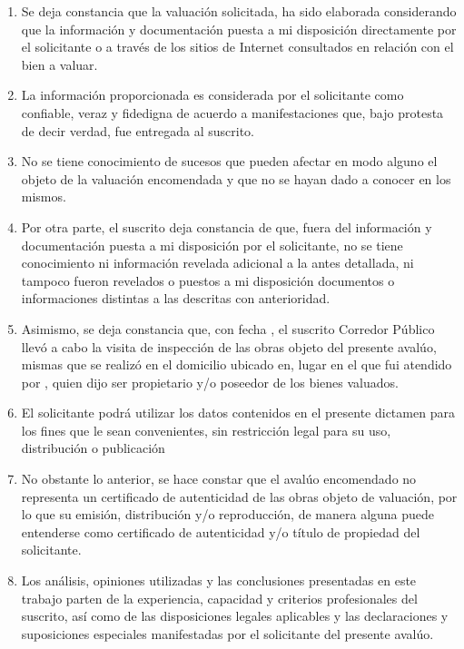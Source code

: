 \begin{enumerate}[\indent a)]

\item Se deja constancia que la valuaci\'on solicitada, ha sido elaborada considerando que la informaci\'on y documentaci\'on puesta a mi disposici\'on directamente por el solicitante o a trav\'es de los sitios de Internet consultados en relaci\'on con el bien a valuar.

\item La informaci\'on proporcionada es considerada por el solicitante como confiable, veraz y fidedigna de acuerdo a manifestaciones que, bajo protesta de decir verdad, fue entregada al suscrito.

\item No se tiene conocimiento de sucesos que pueden afectar en modo alguno el objeto de la valuaci\'on encomendada y que no se hayan dado a conocer en los mismos.

\item Por otra parte, el suscrito deja constancia de que, fuera del informaci\'on y documentaci\'on puesta a mi disposici\'on por el solicitante, no se tiene conocimiento ni informaci\'on revelada adicional a la antes detallada, ni tampoco fueron revelados o puestos a mi disposici\'on documentos o informaciones distintas a las descritas con anterioridad.

\item Asimismo, se deja constancia que, con fecha  \textcolor{principal}{\fechaInspeccion}, el suscrito Corredor P\'ublico llev\'o a cabo la visita de inspecci\'on de las obras objeto del presente aval\'uo, mismas que se realiz\'o en el domicilio ubicado en\textcolor{principal}{\direccionSolicitante}, lugar en el que fui atendido por \insertar, quien dijo ser propietario y/o poseedor de los bienes valuados.

\item El solicitante podr\'a utilizar los datos contenidos en el presente dictamen para los fines que le sean convenientes, sin restricción legal para su uso, distribuci\'on o publicaci\'on

\item No obstante lo anterior, se hace constar que el aval\'uo encomendado no representa un certificado de autenticidad de las obras objeto de valuaci\'on, por lo que su emisi\'on, distribuci\'on y/o reproducci\'on, de manera alguna puede entenderse como certificado de autenticidad y/o t\'itulo de propiedad del solicitante.

\item Los an\'alisis, opiniones utilizadas y las conclusiones presentadas en este trabajo parten de la experiencia, capacidad y criterios profesionales del suscrito, as\'i como de las disposiciones legales aplicables y las declaraciones y suposiciones especiales manifestadas por el solicitante del presente aval\'uo.


\end{enumerate}

